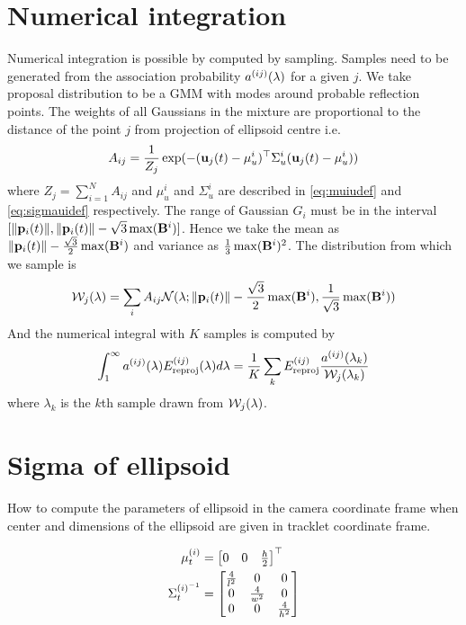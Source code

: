 \section{Numerical integration}
Numerical integration is possible by computed by sampling. Samples need to be
generated from the association probability $a^{(ij)}(\lambda)$ for a given $j$. We take
proposal distribution to be a GMM with modes around probable reflection points.
The weights of all Gaussians in the mixture are proportional to the distance of
the point $j$ from projection of ellipsoid centre i.e. 
\begin{align}
  A_{ij} = \frac{1}{Z_j}\exp(-(\mathbf{u}_j(t) - \mu^i_u)^\top\Sigma_u^i(\mathbf{u}_j(t) - \mu^i_u))
\end{align}
where $Z_j = \sum_{i=1}^N A_{ij}$ and $\mu^i_u$ and $\Sigma_u^i$ are described in \eqref{eq:muiudef} and \eqref{eq:sigmauidef} respectively.
The range of Gaussian $G_i$
must be in the interval $[\|\mathbf{p}_{i}({t})\|, \|\mathbf{p}_{i}({t})\| -
\sqrt{3}\max(\mathbf{B}^{i})]$. Hence we take the mean as $\|\mathbf{p}_{i}({t})\| -
\frac{\sqrt{3}}{2}\max(\mathbf{B}^{i})$ and variance as
$\frac{1}{3}\max(\mathbf{B}^{i})^2$. The distribution from which we sample is 
\begin{align}
  \mathcal{W}_j(\lambda) = \sum_i A_{ij} \mathcal{N}(\lambda; \|\mathbf{p}_{i}({t})\| -
  \frac{\sqrt{3}}{2}\max(\mathbf{B}^{i}), \frac{1}{\sqrt{3}}\max(\mathbf{B}^{i}))
\end{align}
And the numerical integral with $K$ samples is computed by
\begin{align}
    \int_1^{\infty}
    a^{(ij)}(\lambda)
    E^{(ij)}_{\text{reproj}}(\lambda)
    d\lambda
    =
    \frac{1}{K}\sum_k E^{(ij)}_{\text{reproj}} \frac{a^{(ij)}(\lambda_k)}{\mathcal{W}_j(\lambda_k)}
\end{align}
where $\lambda_k$ is the $k$th sample drawn from $\mathcal{W}_j(\lambda)$.

\section{Sigma of ellipsoid}
How to compute the parameters of ellipsoid in the camera coordinate frame when center and dimensions of the ellipsoid are given in tracklet coordinate frame.
\label{sec:sigmacomputation}

\begin{align}
  \mu^{(i)}_t &= \begin{bmatrix}
  0& 0& \frac{h}{2}
  \end{bmatrix}^\top\\
  \Sigma^{(i)^{-1}}_t &= \begin{bmatrix}
    \frac{4}{l^2} & 0 & 0 \\
    0 & \frac{4}{w^2} & 0 \\
    0 & 0 & \frac{4}{h^2}
  \end{bmatrix}
\end{align}

